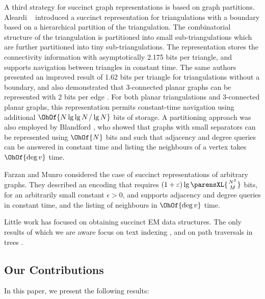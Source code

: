 {A third strategy for succinct graph representations is based on graph
partitions.
Aleardi \etal~\cite{DBLP:conf/wads/AleardiDS05}
introduced a succinct representation for triangulations with a
boundary based on a hierarchical partition of the triangulation.
The combinatorial structure of the triangulation is partitioned into small
sub-triangulations which are further partitioned into tiny
sub-triangulations.
The representation stores the connectivity
information with asymptotically 2.175 bits per triangle, and supports
navigation between triangles in constant time.
The same authors presented an improved result of 1.62 bits per triangle for
triangulations without a boundary, and also demonstrated that
3-connected planar graphs can be represented with 2 bits per edge
\cite{DBLP:journals/tcs/AleardiDS08}.
For both planar triangulations and 3-connected planar graphs, this
representation permits constant-time navigation using additional
$\OhOf{N \lg \lg N \mathop{/} \lg N}$ bits of storage.
A partitioning approach was also
employed by Blandford \cite{DBLP:conf/soda/BlandfordBK03}, who showed
that graphs with small separators can be represented using $\OhOf{N}$
bits and such that adjacency and degree queries can be answered in
constant time and listing the neighbours of a vertex takes
$\OhOf{\deg{v}}$ time.

Farzan and Munro \cite{DBLP:conf/esa/FarzanM08} considered
the case of succinct representations of arbitrary graphs.
They described an encoding that requires
$(1 + \epsilon) \lg \parensXL{\genfrac{}{}{0pt}{}{N^2}{M}}$ bits,
for an arbitrarily small constant $\epsilon > 0$,
and supports adjacency and degree queries in constant
time, and the listing of neighbours in $\OhOf{\deg{v}}$ time.

Little work has focused on obtaining succinct EM data structures.
The only results of which we are aware focus on text indexing \cite{DBLP:conf/dcc/ChienHSV08,
  clark_96}, and on path traversals in trees \cite{DillabaughHM08}.

\subsection{Our Contributions}

In this paper, we present the following results:

}
